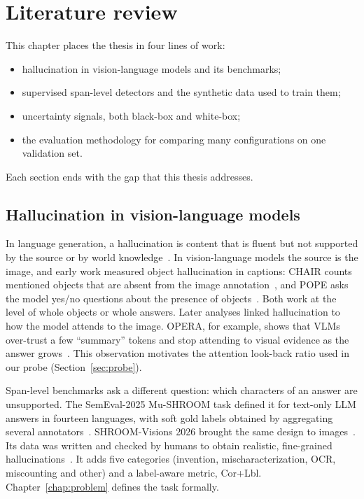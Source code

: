 \chapter{Literature review}\label{chap:lit}

This chapter places the thesis in four lines of work:
\begin{itemize}
    \item hallucination in vision-language models and its benchmarks;
    \item supervised span-level detectors and the synthetic data used to train them;
    \item uncertainty signals, both black-box and white-box;
    \item the evaluation methodology for comparing many configurations on one validation set.
\end{itemize}
Each section ends with the gap that this thesis addresses.

\section{Hallucination in vision-language models}

In language generation, a hallucination is content that is fluent but not supported by the source or by world knowledge~\cite{ji2023survey}. In vision-language models the source is the image, and early work measured object hallucination in captions: CHAIR counts mentioned objects that are absent from the image annotation~\cite{rohrbach2018object}, and POPE asks the model yes/no questions about the presence of objects~\cite{li2023pope}. Both work at the level of whole objects or whole answers. Later analyses linked hallucination to how the model attends to the image. OPERA, for example, shows that VLMs over-trust a few ``summary'' tokens and stop attending to visual evidence as the answer grows~\cite{huang2024opera}. This observation motivates the attention look-back ratio used in our probe (Section~\ref{sec:probe}).

Span-level benchmarks ask a different question: which characters of an answer are unsupported. The SemEval-2025 Mu-SHROOM task defined it for text-only LLM answers in fourteen languages, with soft gold labels obtained by aggregating several annotators~\cite{vazquez-etal-2025-semeval}. SHROOM-Visions 2026 brought the same design to images~\cite{vazquez2026shroomvisionsoverview}. Its data was written and checked by humans to obtain realistic, fine-grained hallucinations~\cite{mickus2026humansdreamelectricsheep}. It adds five categories (invention, mischaracterization, OCR, miscounting and other) and a label-aware metric, Cor+Lbl. Chapter~\ref{chap:problem} defines the task formally.

